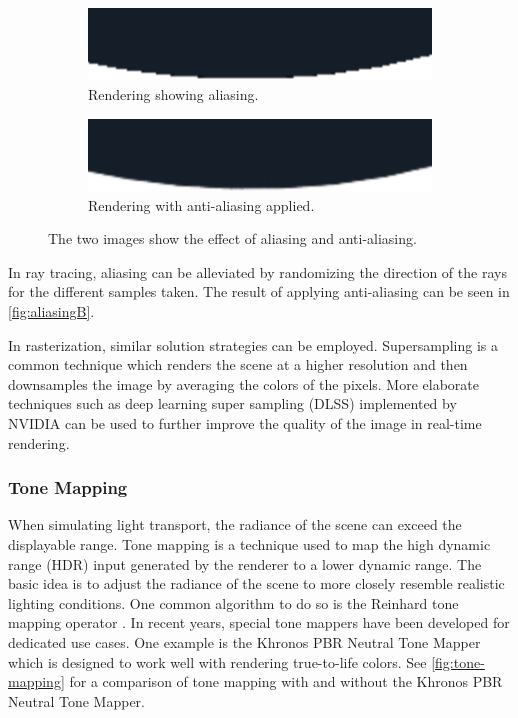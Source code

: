 \begin{figure}[H]
    \centering
    \begin{subfigure}[b]{0.45\textwidth}
        \includegraphics[width=\textwidth]{resources/aliasing.png}
        \caption{Rendering showing aliasing.}
        \label{fig:aliasingA}
    \end{subfigure}
    \hfill
    \begin{subfigure}[b]{0.45\textwidth}
        \includegraphics[width=\textwidth]{resources/anti-aliasing.png}
        \caption{Rendering with anti-aliasing applied.}
        \label{fig:aliasingB}
    \end{subfigure}
    \caption{The two images show the effect of aliasing and anti-aliasing.}
    \label{fig:aliasing}
\end{figure}

In ray tracing, aliasing can be alleviated by randomizing the direction of the rays for the different samples taken. The result of applying anti-aliasing can be seen in \autoref{fig:aliasingB}.

In rasterization, similar solution strategies can be employed. Supersampling is a common technique which renders the scene at a higher resolution and then downsamples the image by averaging the colors of the pixels. More elaborate techniques such as deep learning super sampling (DLSS) implemented by NVIDIA \cite{nvidiaDlss} can be used to further improve the quality of the image in real-time rendering.

\subsubsection{Tone Mapping}
\label{sec:toneMappingTheory}

When simulating light transport, the radiance of the scene can exceed the displayable range. Tone mapping is a technique used to map the high dynamic range (\gls{HDR}) input generated by the renderer to a lower dynamic range. The basic idea is to adjust the radiance of the scene to more closely resemble realistic lighting conditions. One common algorithm to do so is the Reinhard tone mapping operator \cite{reinhardToneMapping}. In recent years, special tone mappers have been developed for dedicated use cases. One example is the Khronos PBR Neutral Tone Mapper \cite{pbrNeutralToneMapping} which is designed to work well with rendering true-to-life colors. See \autoref{fig:tone-mapping} for a comparison of tone mapping with and without the Khronos PBR Neutral Tone Mapper.

